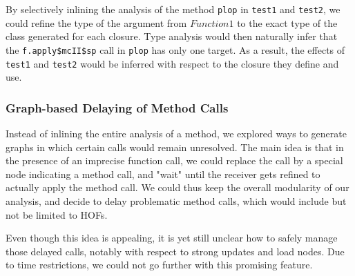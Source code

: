 By selectively inlining the analysis of the method \verb/plop/ in \verb/test1/ and
\verb/test2/, we could refine the type of the argument from $Function1$ to the
exact type of the class generated for each closure. Type analysis would then
naturally infer that the \verb/f.apply$mcII$sp/ call in \verb/plop/ has only
one target.  As a result, the effects of \verb/test1/ and \verb/test2/ would be
inferred with respect to the closure they define and use.

\subsubsection{Graph-based Delaying of Method Calls}
Instead of inlining the entire analysis of a method, we explored ways to
generate graphs in which certain calls would remain unresolved. The main idea
is that in the presence of an imprecise function call, we could replace the
call by a special node indicating a method call, and "wait" until the receiver
gets refined to actually apply the method call. We could thus keep the overall
modularity of our analysis, and decide to delay problematic method calls, which
would include but not be limited to HOFs.

Even though this idea is appealing, it is yet still unclear how to safely
manage those delayed calls, notably with respect to strong updates and load
nodes. Due to time restrictions, we could not go further with this promising
feature.


